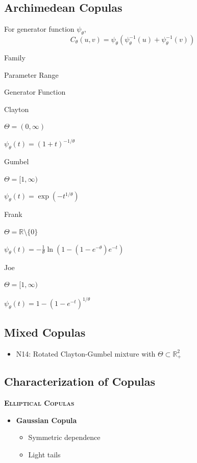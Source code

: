 \documentclass[
  letterpaper,
  DIV=11,
  numbers=noendperiod]{scrartcl}
\providecommand{\tightlist}{%
  \setlength{\itemsep}{0pt}\setlength{\parskip}{0pt}}\usepackage{longtable,booktabs,array}
\begin{document}
\subsection{Archimedean Copulas}\label{archimedean-copulas}

For generator function \(\psi_\theta\),
\[C_\theta(u,v) = \psi_\theta(\psi_\theta^{-1}(u) + \psi_\theta^{-1}(v))\]

Family

Parameter Range

Generator Function

Clayton

\(\Theta = (0, \infty)\)

\(\psi_\theta(t) = (1 + t)^{-1/\theta}\)

Gumbel

\(\Theta = [1, \infty)\)

\(\psi_\theta(t) = \exp(-t^{1/\theta})\)

Frank

\(\Theta = \mathbb{R}\setminus\{0\}\)

\(\psi_\theta(t) = -\frac{1}{\theta}\ln(1 - (1 - e^{-\theta})e^{-t})\)

Joe

\(\Theta = [1, \infty)\)

\(\psi_\theta(t) = 1 - (1 - e^{-t})^{1/\theta}\)

\subsection{Mixed Copulas}\label{mixed-copulas}

\begin{itemize}
\tightlist
\item
  N14: Rotated Clayton-Gumbel mixture with
  \(\Theta \subset \mathbb{R}^2_+\)
\end{itemize}

\subsection{Characterization of
Copulas}\label{characterization-of-copulas}

\textsc{\textbf{Elliptical Copulas}}

\begin{itemize}
\tightlist
\item
  \textbf{Gaussian Copula}

  \begin{itemize}
  \tightlist
  \item
    Symmetric dependence
  \item
    Light tails
  \end{itemize}
\end{itemize}
\end{document}
